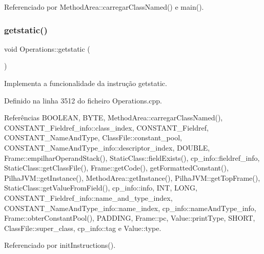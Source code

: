 Referenciado por Method\+Area\+::carregar\+Class\+Named() e main().

\mbox{\label{classOperations_a0514422a81aa3efa5cb8b3bd1a505a68}} 
\subsubsection{\texorpdfstring{getstatic()}{getstatic()}}
{\footnotesize\ttfamily void Operations\+::getstatic (\begin{DoxyParamCaption}{ }\end{DoxyParamCaption})\hspace{0.3cm}{\ttfamily [private]}}



Implementa a funcionalidade da instrução getstatic. 



Definido na linha 3512 do ficheiro Operations.\+cpp.



Referências B\+O\+O\+L\+E\+AN, B\+Y\+TE, Method\+Area\+::carregar\+Class\+Named(), C\+O\+N\+S\+T\+A\+N\+T\+\_\+\+Fieldref\+\_\+info\+::class\+\_\+index, C\+O\+N\+S\+T\+A\+N\+T\+\_\+\+Fieldref, C\+O\+N\+S\+T\+A\+N\+T\+\_\+\+Name\+And\+Type, Class\+File\+::constant\+\_\+pool, C\+O\+N\+S\+T\+A\+N\+T\+\_\+\+Name\+And\+Type\+\_\+info\+::descriptor\+\_\+index, D\+O\+U\+B\+LE, Frame\+::empilhar\+Operand\+Stack(), Static\+Class\+::field\+Exists(), cp\+\_\+info\+::fieldref\+\_\+info, Static\+Class\+::get\+Class\+File(), Frame\+::get\+Code(), get\+Formatted\+Constant(), Pilha\+J\+V\+M\+::get\+Instance(), Method\+Area\+::get\+Instance(), Pilha\+J\+V\+M\+::get\+Top\+Frame(), Static\+Class\+::get\+Value\+From\+Field(), cp\+\_\+info\+::info, I\+NT, L\+O\+NG, C\+O\+N\+S\+T\+A\+N\+T\+\_\+\+Fieldref\+\_\+info\+::name\+\_\+and\+\_\+type\+\_\+index, C\+O\+N\+S\+T\+A\+N\+T\+\_\+\+Name\+And\+Type\+\_\+info\+::name\+\_\+index, cp\+\_\+info\+::name\+And\+Type\+\_\+info, Frame\+::obter\+Constant\+Pool(), P\+A\+D\+D\+I\+NG, Frame\+::pc, Value\+::print\+Type, S\+H\+O\+RT, Class\+File\+::super\+\_\+class, cp\+\_\+info\+::tag e Value\+::type.



Referenciado por init\+Instructions().

